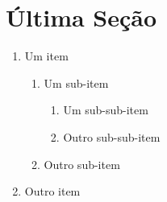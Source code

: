 \section{Última Seção}

    \begin{enumerate}
        \item Um item
        \begin{enumerate}
            \item Um sub-item
            \begin{enumerate}
                \item Um sub-sub-item
                \item Outro sub-sub-item
            \end{enumerate}
            \item Outro sub-item
        \end{enumerate}
        \item Outro item
    \end{enumerate}